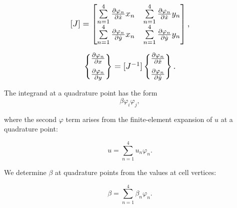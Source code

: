 \begin{equation}
  \label{gliss.eq.Jacobian_eval_2d}
  \scalebox{1.2}{
  $
        [J]=\left[ \begin{matrix}
            \sum\limits_{n=1}^{4}{\frac{\partial {{\varphi }_{n}}}{\partial \hat{x}}{{x}_{n}}} & \sum\limits_{n=1}^{4}{\frac{\partial {{\varphi }_{n}}}{\partial \hat{x}}{{y}_{n}}} \\[6pt]
            \sum\limits_{n=1}^{4}{\frac{\partial {{\varphi }_{n}}}{\partial \hat{y}}{{x}_{n}}} & \sum\limits_{n=1}^{4}{\frac{\partial {{\varphi }_{n}}}{\partial \hat{y}}{{y}_{n}}} \\[6pt]
          \end{matrix} \right],
        $
        }
\end{equation}

\begin{equation}
  \label{gliss.eq.reference_to_real_2d}
  \scalebox{1.2}{
    $
  \left\{ \begin{matrix}
     \frac{\partial {{\varphi }_{n}}}{\partial x}  \\[6pt]
     \frac{\partial {{\varphi }_{n}}}{\partial y}  \\
  \end{matrix} \right\} =
          [J^{-1}]  \left\{ \begin{matrix}
    \frac{\partial {{\varphi }_{n}}}{\partial \hat{x}}  \\[6pt]
    \frac{\partial {{\varphi }_{n}}}{\partial \hat{y}}  \\
  \end{matrix} \right\}. 
          $
          }
\end{equation}

The integrand at a quadrature point has the form
\begin{equation}
  \label{gliss.eq.beta_integrand}
  \beta \varphi_i \varphi_j,
\end{equation}

\noindent
where the second $\varphi$ term arises from the finite-element expansion of $u$ at a quadrature point:

\begin{equation}
  u = \sum\limits_{n=1}^{4} {u_n \varphi_n}.
\end{equation}

\noindent
We determine $\beta$ at quadrature points from the values at cell vertices:

\begin{equation}
  \beta = \sum\limits_{n=1}^{4} {\beta_n \varphi_n}.
\end{equation}

